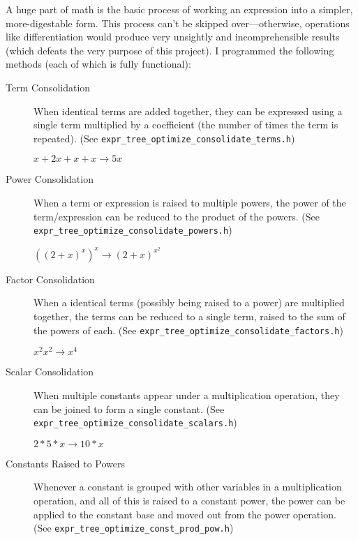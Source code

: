 \documentclass{article}
\begin{document}
A huge part of math is the basic process of working an expression into a simpler, more-digestable form. This process can't be skipped over---otherwise, operations like differentiation would produce very unsightly and incomprehensible results (which defeats the very purpose of this project). I programmed the following methods (each of which is fully functional):

\begin{description}
\item[Term Consolidation] When identical terms are added together, they can be expressed using a single term multiplied by a coefficient (the number of times the term is repeated). \newline(See \verb|expr_tree_optimize_consolidate_terms.h|)

$x+2x+x+x \rightarrow 5x$


\item[Power Consolidation] When a term or expression is raised to multiple powers, the power of the term/expression can be reduced to the product of the powers. (See \verb|expr_tree_optimize_consolidate_powers.h|)

${\left((2+x)^x\right)}^x \rightarrow (2+x)^{x^2}$


\item[Factor Consolidation] When a identical terms (possibly being raised to a power) are multiplied together, the terms can be reduced to a single term, raised to the sum of the powers of each.
\newline(See \verb|expr_tree_optimize_consolidate_factors.h|)

$x^2x^2 \rightarrow x^4$


\item[Scalar Consolidation]
When multiple constants appear under a multiplication operation, they can be joined to form a single constant.  (See \verb|expr_tree_optimize_consolidate_scalars.h|)

$2*5*x \rightarrow 10*x$

\item[Constants Raised to Powers] 
Whenever a constant is grouped with other variables in a multiplication operation, and all of this is raised to a constant power, the power can be applied to the constant base and moved out from the power operation. (See \verb|expr_tree_optimize_const_prod_pow.h|)


\end{description}
\end{document}

